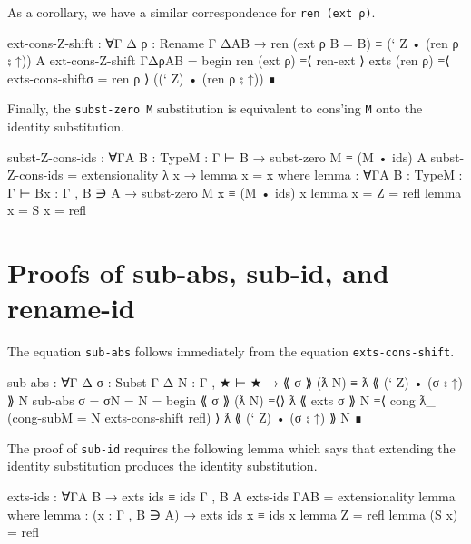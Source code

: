 As a corollary, we have a similar correspondence for
\texttt{ren\ (ext\ ρ)}.

\begin{fence}
\begin{code}
ext-cons-Z-shift : ∀{Γ Δ} {ρ : Rename Γ Δ}{A}{B}
                 → ren (ext ρ {B = B}) ≡ (` Z • (ren ρ ⨟ ↑)) {A}
ext-cons-Z-shift {Γ}{Δ}{ρ}{A}{B} =
  begin
    ren (ext ρ)
  ≡⟨ ren-ext ⟩
    exts (ren ρ)
  ≡⟨ exts-cons-shift{σ = ren ρ} ⟩
   ((` Z) • (ren ρ ⨟ ↑))
  ∎
\end{code}
\end{fence}

Finally, the \texttt{subst-zero\ M} substitution is equivalent to
cons'ing \texttt{M} onto the identity substitution.

\begin{fence}
\begin{code}
subst-Z-cons-ids : ∀{Γ}{A B : Type}{M : Γ ⊢ B}
                 → subst-zero M ≡ (M • ids) {A}
subst-Z-cons-ids = extensionality λ x → lemma {x = x}
  where
  lemma : ∀{Γ}{A B : Type}{M : Γ ⊢ B}{x : Γ , B ∋ A}
                      → subst-zero M x ≡ (M • ids) x
  lemma {x = Z} = refl
  lemma {x = S x} = refl
\end{code}
\end{fence}

\hypertarget{proofs-of-sub-abs-sub-id-and-rename-id}{%
\section{Proofs of sub-abs, sub-id, and
rename-id}\label{proofs-of-sub-abs-sub-id-and-rename-id}}

The equation \texttt{sub-abs} follows immediately from the equation
\texttt{exts-cons-shift}.

\begin{fence}
\begin{code}
sub-abs : ∀{Γ Δ} {σ : Subst Γ Δ} {N : Γ , ★ ⊢ ★}
        → ⟪ σ ⟫ (ƛ N) ≡ ƛ ⟪ (` Z) • (σ ⨟ ↑) ⟫ N
sub-abs {σ = σ}{N = N} =
   begin
     ⟪ σ ⟫ (ƛ N)
   ≡⟨⟩
     ƛ ⟪ exts σ ⟫ N
   ≡⟨ cong ƛ_ (cong-sub{M = N} exts-cons-shift refl) ⟩
     ƛ ⟪ (` Z) • (σ ⨟ ↑) ⟫ N
   ∎
\end{code}
\end{fence}

The proof of \texttt{sub-id} requires the following lemma which says
that extending the identity substitution produces the identity
substitution.

\begin{fence}
\begin{code}
exts-ids : ∀{Γ}{A B}
         → exts ids ≡ ids {Γ , B} {A}
exts-ids {Γ}{A}{B} = extensionality lemma
  where lemma : (x : Γ , B ∋ A) → exts ids x ≡ ids x
        lemma Z = refl
        lemma (S x) = refl
\end{code}
\end{fence}

